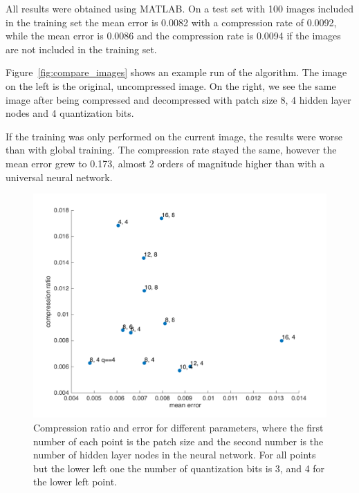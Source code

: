 All results were obtained using MATLAB. On a test set with 100 images included in the training set the mean error is 0.0082 with a compression rate of 0.0092, while the mean error is 0.0086 and the compression rate is 0.0094 if the images are not included in the training set.

Figure~\ref{fig:compare_images} shows an example run of the algorithm. The image on the left is the original, uncompressed image. On the right, we see the same image after being compressed and decompressed with patch size 8, 4 hidden layer nodes and 4 quantization bits. 

If the training was only performed on the current image, the results were worse than with global training. The compression rate stayed the same, however the mean error grew to 0.173, almost 2 orders of magnitude higher than with a universal neural network.

\begin{figure}[tbp]
  \centering
  \includegraphics[width=\columnwidth]{images/optParams}
  \caption{Compression ratio and error for different parameters, where the first number of each point is the patch size and the second number is the number of hidden layer nodes in the neural network. For all points but the lower left one the number of quantization bits is 3, and 4 for the lower left point.}
  \label{fig:optParams}
\end{figure}

